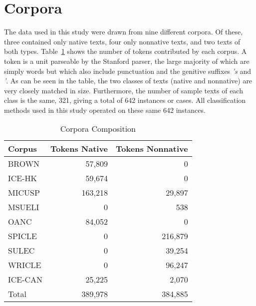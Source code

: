 \documentclass[main.tex]{subfiles}
\begin{document}
\section{Corpora}
\setcounter{section}{3}

The data used in this study were drawn from nine different corpora. Of these, three contained only native texts, four only nonnative texts, and two texts of both types. Table~\ref{table:corpora} shows the number of tokens contributed by each corpus. A token is a unit parseable by the Stanford parser, the large majority of which are simply words but which also include punctuation and the genitive suffixes \textit{'s} and \textit{'}. As can be seen in the table, the two classes of texts (native and nonnative) are very closely matched in size. Furthermore, the number of sample texts of each class is the same, 321, giving a total of 642 instances or cases. All classification methods used in this study operated on these same 642 instances.

\begin{table}[htbp]
\small
\centering
\caption{Corpora Composition}
  \begin{tabular}{  l  r  r }
  \toprule
    Corpus & Tokens Native & Tokens Nonnative \\ \midrule
    BROWN & 57,809 & 0 \\
    ICE-HK & 59,674 & 0 \\
    MICUSP & 163,218  & 29,897 \\
    MSUELI & 0 & 538 \\
    OANC & 84,052 & 0 \\
    SPICLE & 0 & 216,879 \\
    SULEC & 0 & 39,254 \\
    WRICLE & 0 & 96,247  \\
    ICE-CAN & 25,225 & 2,070 \\
    \midrule
    Total & 389,978 & 384,885  \\
    \bottomrule
  \end{tabular}
\label{table:corpora}
\end{table}
\end{document}
